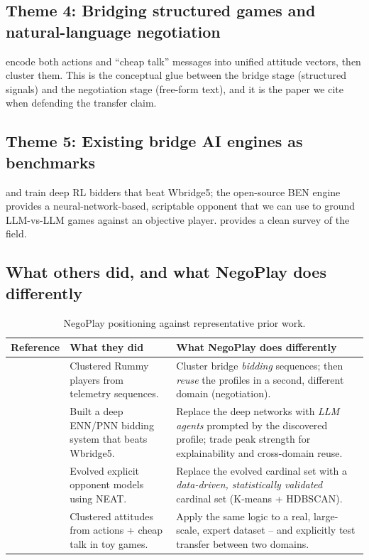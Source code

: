\documentclass[11pt, a4paper, oneside, openany]{report}
\begin{document}
\subsection*{Theme 4: Bridging structured games and natural-language negotiation}

\citet{james2021attitude} encode both actions and ``cheap talk'' messages into unified attitude vectors, then cluster them. This is the conceptual glue between the bridge stage (structured signals) and the negotiation stage (free-form text), and it is the paper we cite when defending the transfer claim.

\subsection*{Theme 5: Existing bridge AI engines as benchmarks}

\citet{yeh2018automatic} and \citet{kita2024simple} train deep RL bidders that beat Wbridge5; the open-source BEN engine \citep{lorserker_ben} provides a neural-network-based, scriptable opponent that we can use to ground LLM-vs-LLM games against an objective player. \citet{jarosz2022review} provides a clean survey of the field.

\subsection*{What others did, and what NegoPlay does differently}

\begin{table}[H]
\centering\small
\caption{NegoPlay positioning against representative prior work.}
\label{tab:positioning}
\begin{tabularx}{\textwidth}{p{3.2cm} X X}
\toprule
\textbf{Reference} & \textbf{What they did} & \textbf{What NegoPlay does differently} \\
\midrule
\citet{talwadker2022cognitionnet} & Clustered Rummy players from telemetry sequences. & Cluster bridge \emph{bidding} sequences; then \emph{reuse} the profiles in a second, different domain (negotiation). \\
\citet{rong2019competitive} & Built a deep ENN/PNN bidding system that beats Wbridge5. & Replace the deep networks with \emph{LLM agents} prompted by the discovered profile; trade peak strength for explainability and cross-domain reuse. \\
\citet{lockett2007evolving} & Evolved explicit opponent models using NEAT. & Replace the evolved cardinal set with a \emph{data-driven, statistically validated} cardinal set (K-means + HDBSCAN). \\
\citet{james2021attitude} & Clustered attitudes from actions + cheap talk in toy games. & Apply the same logic to a real, large-scale, expert dataset -- and explicitly test transfer between two domains. \\
\bottomrule
\end{tabularx}
\end{table}
\end{document}
